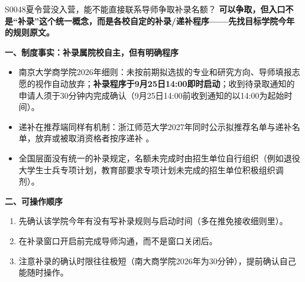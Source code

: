\begin{qa}{S0048}{夏令营没入营，能不能直接联系导师争取补录名额？}
\textbf{可以争取，但入口不是“补录”这个统一概念，而是各校自定的补录/递补程序——先找目标学院今年的规则原文。}

\textbf{一、制度事实：补录属院校自主，但有明确程序}
\begin{itemize}
  \item 南京大学商学院2026年细则：未按前期拟选拔的专业和研究方向、导师填报志愿的视作自动放弃；\textbf{补录程序于9月25日14:00即时启动}；收到待录取通知的申请人须于30分钟内完成确认（9月25日14:00前收到通知的以14:00为起始时间）。
  \item 递补在推荐端同样有机制：浙江师范大学2027年同时公示拟推荐名单与递补名单，放弃或被取消资格者按序递补 。
  \item 全国层面没有统一的补录规定，名额未完成时由招生单位自行组织（例如退役大学生士兵专项计划，教育部要求专项计划未完成的招生单位积极组织调剂）。
\end{itemize}

\textbf{二、可操作顺序}
\begin{enumerate}
  \item 先确认该学院今年有没有写补录规则与启动时间（多在推免接收细则里）。
  \item 在补录窗口开启前完成导师沟通，而不是窗口关闭后。
  \item 注意补录的确认时限往往极短（南大商学院2026年为30分钟），提前确认自己能随时操作。
\end{enumerate}
\end{qa}

